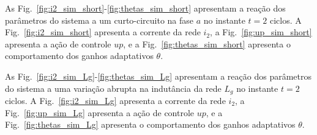   \newpage

  As Fig.~\ref{fig:i2_sim_short}-\ref{fig:thetas_sim_short} apresentam a reação dos parâmetros do sistema a um curto-circuito na fase $a$ no instante $t=2$ ciclos. A Fig.~\ref{fig:i2_sim_short} apresenta a corrente da rede $i_2$, a Fig.~\ref{fig:up_sim_short} apresenta a ação de controle $up$, e a Fig.~\ref{fig:thetas_sim_short} apresenta o comportamento dos ganhos adaptativos $\theta$.

  \vfill
  \noindent
  \begin{minipage}{\textwidth}
    \makebox[\textwidth]{
      \centering
      \def\svgwidth{\textwidth}
      }
    \label{fig:i2_sim_short}
  \end{minipage}

  \vfill

  \newpage

  \vfill
  \noindent
  \begin{minipage}{\textwidth}
    \makebox[\textwidth]{
      \centering
      \def\svgwidth{\textwidth}
      }
    \label{fig:up_sim_short}
  \end{minipage}

  \vfill
  \noindent
  \begin{minipage}{\textwidth}
    \makebox[\textwidth]{
      \centering
      \def\svgwidth{\textwidth}
      }
    \label{fig:thetas_sim_short}
  \end{minipage}
  \vfill

  \newpage

  As Fig.~\ref{fig:i2_sim_Lg}-\ref{fig:thetas_sim_Lg} apresentam a reação dos parâmetros do sistema a uma variação abrupta na indutância da rede $L_g$ no instante $t=2$ ciclos. A Fig.~\ref{fig:i2_sim_Lg} apresenta a corrente da rede $i_2$, a Fig.~\ref{fig:up_sim_Lg} apresenta a ação de controle $up$, e a Fig.~\ref{fig:thetas_sim_Lg} apresenta o comportamento dos ganhos adaptativos $\theta$.

  \vfill
  \noindent
  \begin{minipage}{\textwidth}
    \makebox[\textwidth]{
      \centering
      \def\svgwidth{\textwidth}
      }
    \label{fig:i2_sim_Lg}
  \end{minipage}
  \vfill

